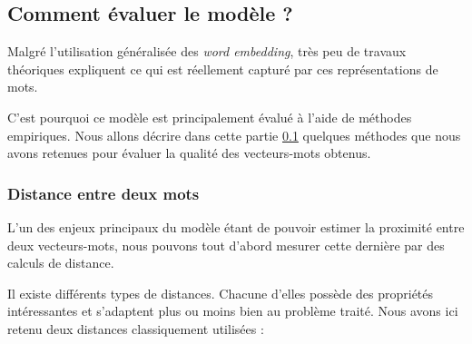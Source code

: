 \documentclass[11pt,french,french]{article}
\begin{document}
\hypertarget{sec:commentEvaluer}{%
\subsection{Comment évaluer le modèle ?}\label{sec:commentEvaluer}}

Malgré l'utilisation généralisée des \emph{word embedding}, très peu de travaux théoriques expliquent ce qui est réellement capturé par ces représentations de mots.

C'est pourquoi ce modèle est principalement évalué à l'aide de méthodes empiriques. Nous allons décrire dans cette partie \ref{sec:commentEvaluer} quelques méthodes que nous avons retenues pour évaluer la qualité des vecteurs-mots obtenus.

\hypertarget{distance-entre-deux-mots}{%
\subsubsection{Distance entre deux mots}\label{distance-entre-deux-mots}}

L'un des enjeux principaux du modèle étant de pouvoir estimer la proximité entre deux vecteurs-mots, nous pouvons tout d'abord mesurer cette dernière par des calculs de distance.

Il existe différents types de distances. Chacune d'elles possède des propriétés intéressantes et s'adaptent plus ou moins bien au problème traité. Nous avons ici retenu deux distances classiquement utilisées :
\end{document}
